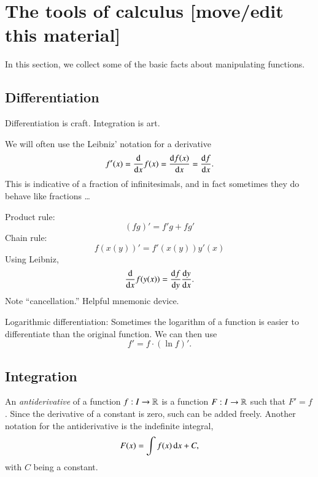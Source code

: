 \section{The tools of calculus [move/edit this material]}

In this section, we collect some of the basic facts about manipulating functions.

\subsection{Differentiation}

Differentiation is craft. Integration is art.

We will often use the Leibniz' notation for a derivative
\begin{equation}
    f'(x) = \frac{\mathrm{d}}{\mathrm{d} x} f(x) = \frac{\mathrm{d} f(x)}{\mathrm{d} x} = \frac{\mathrm{d} f}{\mathrm{d} x}.
\end{equation}
This is indicative of a fraction of infinitesimals, and in fact sometimes they do behave like fractions \ldots

Product rule:
\begin{equation}
    (fg)' = f' g + f g'
\end{equation}
Chain rule:
\begin{equation}
    f(x(y))' = f'(x(y))y'(x)
\end{equation}
Using Leibniz,
\begin{equation}
    \frac{\mathrm{d}}{\mathrm{d} x} f(y(x)) = \frac{\mathrm{d} f}{\mathrm{d} y}\frac{\mathrm{d} y}{\mathrm{d} x}.
\end{equation}
Note ``cancellation.'' Helpful mnemonic device.


Logarithmic differentiation: Sometimes the logarithm of a function is easier to differentiate than the original function. We can then use
\begin{equation}
    f' = f \cdot (\ln f)'.
\end{equation}


\subsection{Integration}

An \emph{antiderivative} of a function $f : I \to \mathbb{R}$ is a function $F : I \to \mathbb{R}$ such that $F' = f$. Since the derivative of a constant is zero, such can be added freely. Another notation for the antiderivative is the indefinite integral,
\begin{equation}
    F(x) = \int f(x)\, \mathrm{d} x + C,
\end{equation}
with $C$ being a constant.


